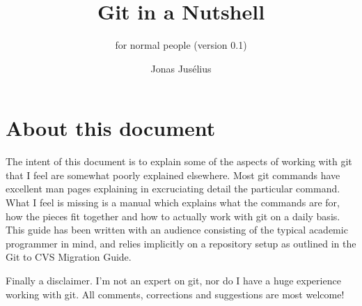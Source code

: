\documentclass[a4paper,10pt]{article}
\begin{document}
\pagestyle{fancy}
\fancyfoot{}
\fancyhead{}
\renewcommand{\sectionmark}[1]{\markboth{\sf\thesection.\ #1}{}}
\renewcommand{\subsectionmark}[1]{}
\fancyhead[R]{{\rmfamily\thepage}}

\title{Git in a Nutshell}

\subtitle{for normal people (version 0.1)}
\author{{\sf Jonas Jus\'elius}}
\address{
{\tt <jonas.juselius@chem.uit.no>}\\
{\sf University of Tromsø}\\
{\sf Department of Chemistry}\\
{\sf N-9037 University of Tromsø, Norway}
}

\maketitle
\section*{About this document}
The intent of this document is to explain some of the aspects of working with
git that I feel are somewhat poorly explained elsewhere. Most git commands
have excellent man pages explaining in excruciating detail the particular
command. What I feel is missing is a manual which explains what the commands
are for, how the pieces fit together and how to actually work with git on a
daily basis. This guide has been written with an audience consisting of the
typical academic programmer in mind, and relies implicitly on a repository
setup as outlined in the Git to CVS Migration Guide.

Finally a disclaimer. I'm not an expert on git, nor do I have a huge
experience working with git. All comments, corrections and suggestions are 
most welcome!
\end{document}
